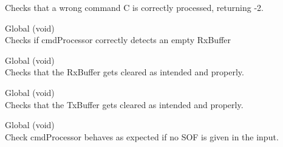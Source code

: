 \begin{DoxyRefList}
\label{test__test000004}%
%
Checks that a wrong command \textquotesingle{}C\textquotesingle{} is correctly processed, returning -\/2.  
\item[Global \doxylink{test__runner_8c_a4c75c93c622c20ec7c43defc70d44313}{test\+\_\+is\+Empty} (void)]\hfill \\
\label{test__test000001}%
%
Checks if cmd\+Processor correctly detects an empty Rx\+Buffer  
\item[Global \doxylink{test__runner_8c_ac31b27ca38cbeea5b00c2f54dc63b6ca}{test\+\_\+reset\+Rx\+Buffer\+\_\+valid} (void)]\hfill \\
\label{test__test000005}%
%
Checks that the Rx\+Buffer gets cleared as intended and properly.  
\item[Global \doxylink{test__runner_8c_ac90f8680891e66ad9504a641219cbfbc}{test\+\_\+reset\+Tx\+Buffer\+\_\+valid} (void)]\hfill \\
\label{test__test000006}%
%
Checks that the Tx\+Buffer gets cleared as intended and properly.  
\item[Global \doxylink{test__runner_8c_a835a764c03deb89f76547a02dab1613d}{test\+\_\+\+SOF\+\_\+missing} (void)]\hfill \\
\label{test__test000007}%
%
Check cmd\+Processor behaves as expected if no SOF is given in the input. 
\end{DoxyRefList}